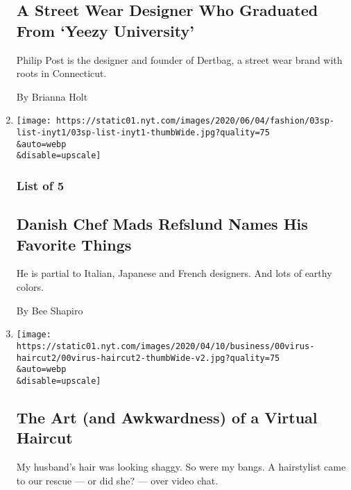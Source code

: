 \begin{enumerate}
  \hypertarget{a-street-wear-designer-who-graduated-from-yeezy-university}{%
  \subsection{A Street Wear Designer Who Graduated From `Yeezy
  University'}\label{a-street-wear-designer-who-graduated-from-yeezy-university}}

  Philip Post is the designer and founder of Dertbag, a street wear
  brand with roots in Connecticut.

  By Brianna Holt
\item
  \href{/2020/06/03/fashion/mens-style/danish-chef-mads-refslund-names-his-favorite-things.html}{}

  \texttt{[image: https://static01.nyt.com/images/2020/06/04/fashion/03sp-list-inyt1/03sp-list-inyt1-thumbWide.jpg?quality=75\\\&auto=webp\\\&disable=upscale]}

  \hypertarget{list-of-5}{%
  \subsubsection{List of 5}\label{list-of-5}}

  \hypertarget{danish-chef-mads-refslund-names-his-favorite-things}{%
  \subsection{Danish Chef Mads Refslund Names His Favorite
  Things}\label{danish-chef-mads-refslund-names-his-favorite-things}}

  He is partial to Italian, Japanese and French designers. And lots of
  earthy colors.

  By Bee Shapiro
\item
  \href{/2020/04/13/technology/coronavirus-virtual-haircut.html}{}

  \texttt{[image: https://static01.nyt.com/images/2020/04/10/business/00virus-haircut2/00virus-haircut2-thumbWide-v2.jpg?quality=75\\\&auto=webp\\\&disable=upscale]}

  \hypertarget{the-art-and-awkwardness-of-a-virtual-haircut}{%
  \subsection{The Art (and Awkwardness) of a Virtual
  Haircut}\label{the-art-and-awkwardness-of-a-virtual-haircut}}

  My husband's hair was looking shaggy. So were my bangs. A hairstylist
  came to our rescue --- or did she? --- over video chat.


\end{enumerate}
